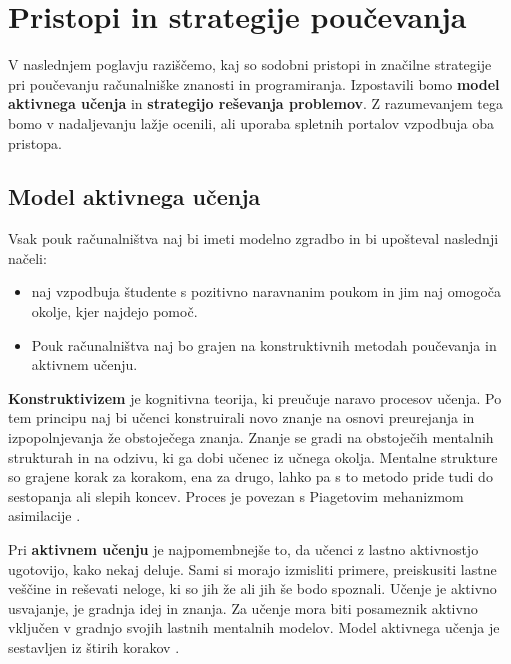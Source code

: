 \section{Pristopi in strategije poučevanja}
\label{sec:aktivno_resevanje_prob}

V naslednjem poglavju raziščemo, kaj so sodobni pristopi in značilne
strategije pri poučevanju računalniške znanosti in
programiranja. Izpostavili bomo \textbf{model aktivnega učenja} in
\textbf{strategijo reševanja problemov}. Z razumevanjem tega bomo v
nadaljevanju lažje ocenili, ali uporaba spletnih portalov vzpodbuja oba
pristopa.

\subsection{Model aktivnega učenja}
\label{sec:model-aktivn-uenja}

Vsak pouk računalništva naj bi imeti modelno zgradbo in bi upošteval
naslednji načeli:
\begin{itemize}
\tightlist
\item naj vzpodbuja študente s pozitivno naravnanim poukom in jim naj
  omogoča okolje, kjer najdejo pomoč.
\item Pouk računalništva naj bo grajen na konstruktivnih metodah
  poučevanja in aktivnem učenju.
\end{itemize}

\textbf{Konstruktivizem} je kognitivna teorija, ki preučuje naravo
procesov učenja. Po tem principu naj bi učenci konstruirali novo
znanje na osnovi preurejanja in izpopolnjevanja že obstoječega
znanja. Znanje se gradi na obstoječih mentalnih strukturah in na
odzivu, ki ga dobi učenec iz učnega okolja. Mentalne strukture so
grajene korak za korakom, ena za drugo, lahko pa s to metodo pride
tudi do sestopanja ali slepih koncev. Proces je povezan s Piagetovim
mehanizmom asimilacije \cite{guideTCS}.

Pri \textbf{aktivnem učenju} je najpomembnejše to, da učenci z lastno
aktivnostjo ugotovijo, kako nekaj deluje. Sami si morajo
izmisliti primere, preiskusiti lastne veščine in reševati neloge, ki
so jih že ali jih še bodo spoznali. Učenje je aktivno usvajanje, je
gradnja idej in znanja. Za učenje mora biti posameznik aktivno
vključen v gradnjo svojih lastnih mentalnih modelov. Model aktivnega
učenja je sestavljen iz štirih korakov \cite{guideTCS}.

